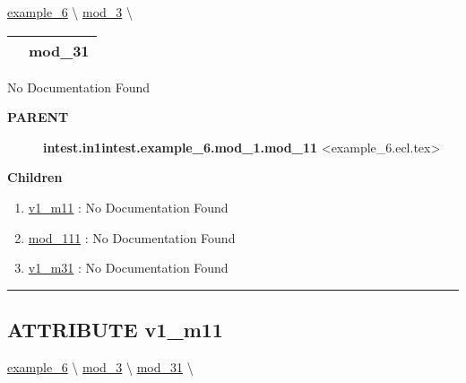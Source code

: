 \hypertarget{ecldoc:intest.in1intest.example_6.mod_3.mod_31}{}
\hspace{0pt} \hyperlink{ecldoc:intest.in1intest.example_6}{example_6} \textbackslash 
\hspace{0pt} \hyperlink{ecldoc:intest.in1intest.example_6.mod_3}{mod_3} \textbackslash 

{\renewcommand{\arraystretch}{1.5}
\begin{tabularx}{\textwidth}{|>{\raggedright\arraybackslash}l|X|}
\hline
\hspace{0pt}\mytexttt{\color{red} } & \textbf{mod\_31} \\
\hline
\end{tabularx}
}

\par





No Documentation Found










\par
\begin{description}
\item [\colorbox{tagtype}{\color{white} \textbf{\textsf{PARENT}}}] \textbf{intest.in1intest.example\_6.mod\_1.mod\_11} <example\_6.ecl.tex>
\end{description}


\textbf{Children}
\begin{enumerate}
\item \hyperlink{ecldoc:intest.in1intest.example_6.mod_1.mod_11.v1_m11}{v1\_m11}
: No Documentation Found
\item \hyperlink{ecldoc:intest.in1intest.example_6.mod_1.mod_11.mod_111}{mod\_111}
: No Documentation Found
\item \hyperlink{ecldoc:intest.in1intest.example_6.mod_3.mod_31.v1_m31}{v1\_m31}
: No Documentation Found
\end{enumerate}

\rule{\linewidth}{0.5pt}

\subsection*{\textsf{\colorbox{headtoc}{\color{white} ATTRIBUTE}
v1\_m11}}

\hypertarget{ecldoc:intest.in1intest.example_6.mod_1.mod_11.v1_m11}{}
\hspace{0pt} \hyperlink{ecldoc:intest.in1intest.example_6}{example_6} \textbackslash 
\hspace{0pt} \hyperlink{ecldoc:intest.in1intest.example_6.mod_3}{mod_3} \textbackslash 
\hspace{0pt} \hyperlink{ecldoc:intest.in1intest.example_6.mod_3.mod_31}{mod_31} \textbackslash 

